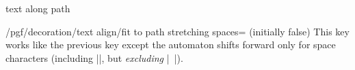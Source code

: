 \begin{decoration}{text along path}
\begin{key}{/pgf/decoration/text align/fit to path stretching spaces= (initially false)}
  This key works like the previous key except the automaton
  shifts forward only for space characters (including |\space|, but
  \emph{excluding} |\ |).

\begin{codeexample}[]
\end{codeexample}
\end{key}

\end{decoration}




